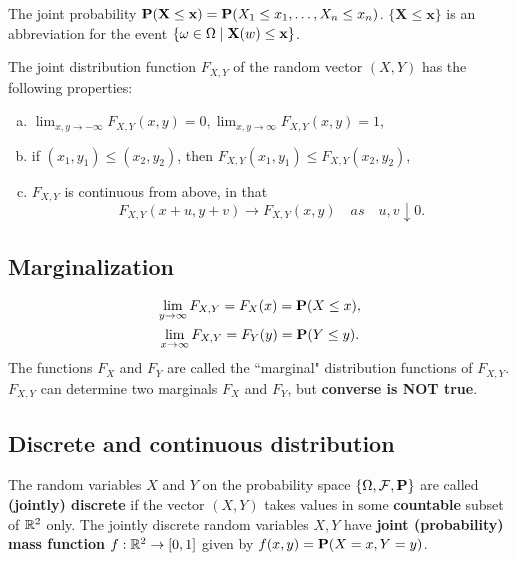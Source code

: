 \begin{remark}
The joint probability $\mathbf{P}(\mathbf{X} \leq \mathbf{x}) = \mathbf{P}(X_1 \leq x_1, \dots, X_n \leq x_n)$. $\{\mathbf{X} \leq \mathbf{x} \}$ is an abbreviation for the event $\{\omega \in \Omega \;\vert\; \mathbf{X}(w) \leq \mathbf{x}\}$.
\end{remark}

\begin{lemma}
The joint distribution function $F_{X, Y}$ of the random vector $(X, Y)$ has the following properties: 
\begin{enumerate}[(a)]
    \item $\lim_{x, y\to -\infty} F_{X, Y}(x, y) = 0, \lim_{x,y\to\infty} F_{X, Y}(x,y) = 1$,
    \item if $(x_1, y_1) \leq (x_2, y_2)$, then $F_{X,Y}(x_1, y_1) \leq F_{X, Y}(x_2, y_2)$,
    \item $F_{X,Y}$ is continuous from above, in that 
    \begin{equation*}
        F_{X,Y}(x+u, y+v) \to F_{X,Y}(x,y) \quad as \quad u, v \downarrow 0.
    \end{equation*}
\end{enumerate}
\end{lemma}

\subsection{Marginalization} 
\begin{gather*}
    \lim_{y\to\infty} F_{X,Y} = F_X(x) = \mathbf{P}(X \leq x), \\
    \lim_{x\to\infty} F_{X,Y} = F_Y(y) = \mathbf{P}(Y \leq y).
\end{gather*}
The functions $F_X$ and $F_Y$ are called the ``marginal" distribution functions of $F_{X,Y}$. $F_{X,Y}$ can determine two marginals $F_X$ and $F_Y$, but \textbf{converse is NOT true}.

\subsection{Discrete and continuous distribution}
\begin{definition}
The random variables $X$ and $Y$ on the probability space $\{ \Omega, \mathcal{F}, \mathbf{P} \}$ are called \textbf{(jointly) discrete} if the vector $(X, Y)$ takes values in some \textbf{countable} subset of $\mathbb{R}^2$ only. The jointly discrete random variables $X, Y$ have \textbf{joint (probability) mass function} $f : \mathbb{R}^2 \to [0,1]$ given by $f(x, y) = \mathbf{P}(X = x, Y = y)$. 
\end{definition}

